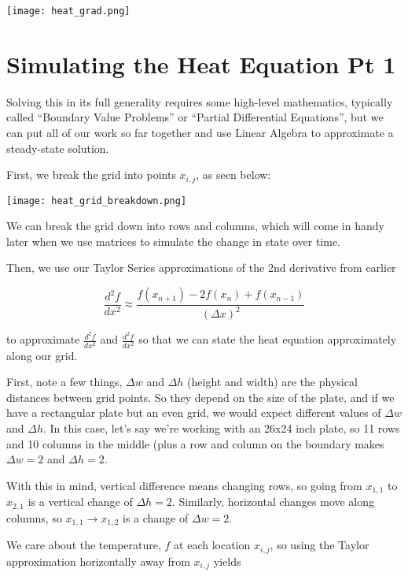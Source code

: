\documentclass{ximera}
\begin{document}
\begin{center}
    \texttt{[image: heat\_grad.png]}
\end{center}

\section{Simulating the Heat Equation Pt 1}

Solving this in its full generality requires some high-level mathematics, typically called  ``Boundary Value Problems'' or ``Partial Differential Equations'', but we can put all of our work so far together and use Linear Algebra to approximate a steady-state solution.

First, we break the grid into points $x_{i,j}$, as seen below:

\begin{center}
    \texttt{[image: heat\_grid\_breakdown.png]}
\end{center}

We can break the grid down into rows and columns, which will come in handy later when we use matrices to simulate the change in state over time.

Then, we use our Taylor Series approximations of the 2nd derivative from earlier 

$$\frac{d^2f}{dx^2}\approx \frac{f(x_{n+1})-2f(x_n)+f(x_{n-1})}{\left(\Delta x\right)^2}$$

to approximate $\frac{d^2f}{dx^2}$ and $\frac{d^2f}{dx^2}$ so that we can state the heat equation approximately along our grid. 

First, note a few things, $\Delta w$ and $\Delta h$ (height and width) are the physical distances between grid points. So they depend on the size of the plate, and if we have a rectangular plate but an even grid, we would expect different values of $\Delta w$ and $\Delta h$. In this case, let's say we're working with an 26x24 inch plate, so 11 rows and 10 columns in the middle (plus a row and column on the boundary makes $\Delta w=2$ and $\Delta h=2$.

With this in mind, vertical difference means changing rows, so going from $x_{1,1}$ to $x_{2,1}$ is a vertical change of $\Delta h=2$. Similarly, horizontal changes move along columns, so $x_{1,1}\rightarrow x_{1,2}$ is a change of $\Delta w=2$.

We care about the temperature, $f$ at each location $x_{i,j}$, so using the Taylor approximation horizontally away from $x_{i,j}$ yields
\end{document}
